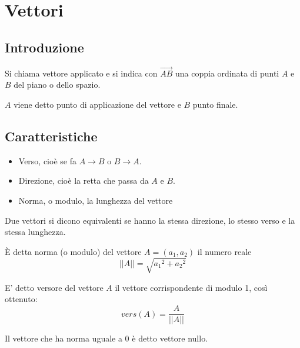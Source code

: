 \chapter{Vettori}

\section{Introduzione}

\begin{definition}
Si chiama vettore applicato e si indica con $\vec{AB}$ una coppia ordinata di punti $A$ e $B$ del piano o dello spazio.
\end{definition}

\begin{definition}
$A$ viene detto punto di applicazione del vettore e $B$ punto finale.
\end{definition}

\section{Caratteristiche}

\begin{itemize}
\item Verso, cioè se fa $A \to B$ o $B \to A$.
\item Direzione, cioè la retta che passa da $A$ e $B$.
\item Norma, o modulo, la lunghezza del vettore
\end{itemize}

\begin{definition}
Due vettori si dicono equivalenti se hanno la stessa direzione, lo stesso verso e la stessa lunghezza.
\end{definition}

\begin{definition}[Norma]
È detta norma (o modulo) del vettore $A=(a_1,a_2)$ il numero reale $$||A|| = \sqrt{{a_1}^2 + {a_2}^2}$$
\end{definition}

\begin{definition}[Versore]
E' detto versore del vettore $A$ il vettore corrispondente di modulo 1,  così ottenuto: $$vers(A)=\frac{A}{||A||}$$
\end{definition}

\begin{definition}
Il vettore che ha norma uguale a 0 è detto vettore nullo.
\end{definition}

